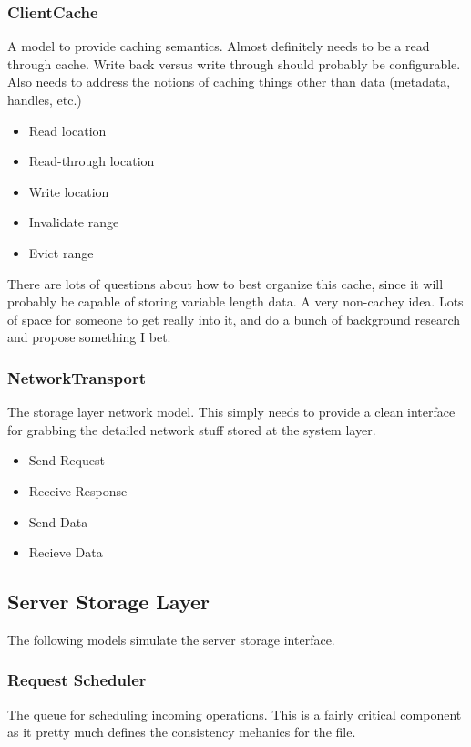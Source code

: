 \documentclass[11pt]{article}
\begin{document}
\subsubsection{ClientCache}
A model to provide caching semantics.  Almost definitely needs to be a read
through cache.  Write back versus write through should probably be
configurable.  Also needs to address the notions of caching things other than
data (metadata, handles, etc.)

\begin{itemize}
\item Read location
\item Read-through location
\item Write location
\item Invalidate range
\item Evict range
\end{itemize}

There are lots of questions about how to best organize this cache, since it
will probably be capable of storing variable length data.  A very non-cachey
idea.  Lots of space for someone to get really into it, and do a bunch of
background research and propose something I bet.

\subsubsection{NetworkTransport}
The storage layer network model.  This simply needs to provide a clean
interface for grabbing the detailed network stuff stored at the system layer.

\begin{itemize}
\item Send Request
\item Receive Response
\item Send Data
\item Recieve Data
\end{itemize}

\subsection{Server Storage Layer}
The following models simulate the server storage interface.

\subsubsection{Request Scheduler}
The queue for scheduling incoming operations.  This is a fairly critical
component as it pretty much defines the consistency mehanics for the file.
\end{document}
